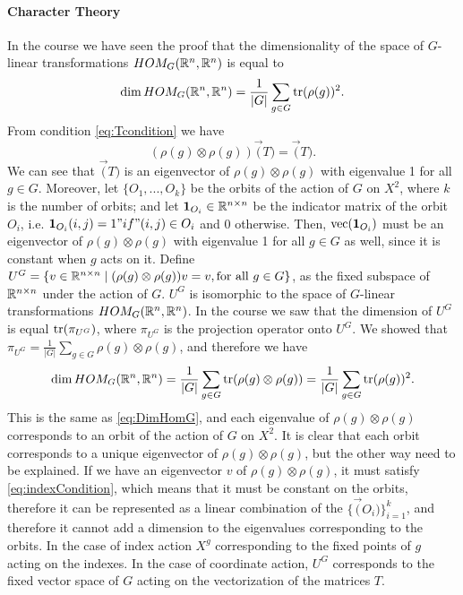 \documentclass[english]{article}
\begin{document}
\paragraph{Character Theory}
In the course we have seen the proof that the dimensionality of the space of $G$-linear transformations $HOM_G(\mathbb{R}^n,\mathbb{R}^n)$ is equal to 
\begin{equation}
    \dim HOM_G(\mathbb{R}^n,\mathbb{R}^n) = \frac{1}{|G|} \sum_{g \in G} \text{tr}(\rho(g))^2
    \label{eq:DimHomG}
    .
\end{equation}
From condition \eqref{eq:Tcondition} we have 
\begin{equation}
    (\rho(g) \otimes \rho(g)) \vec(T) = \vec(T) 
    .
    \label{eq:rhoT}
\end{equation}
We can see that $\vec(T)$ is an eigenvector of $\rho(g) \otimes \rho(g)$ with eigenvalue 1 for all $g \in G$. 
Moreover, let $\{O_1, ..., O_k\}$ be the orbits of the action of $G$ on $X^2$, where $k$ is the number of orbits; and let $\mathbf{1}_{O_i} \in \mathbb{R}^{n\times n}$ be the indicator matrix of the orbit $O_i$, i.e. $\mathbf{1}_{O_i}(i,j) = 1" if "(i,j) \in O_i$ and $0$ otherwise. 
Then, $\text{vec}(\mathbf{1}_{O_i})$ must be an eigenvector of $\rho(g) \otimes \rho(g)$ with eigenvalue 1 for all $g \in G$ as well, since it is constant when $g$ acts on it.
Define  $U^G = \{v \in \mathbb{R}^{n\times n} \mid (\rho(g) \otimes \rho(g)) v = v, \text{for all } g \in G\}$, as the fixed subspace of $\mathbb{R}^{n\times n}$ under the action of $G$. $U^G$ is isomorphic to the space of $G$-linear transformations $HOM_G(\mathbb{R}^n,\mathbb{R}^n)$. In the course we saw that the dimension of $U^G$ is equal $\text{tr}(\pi_{U^G})$, where $\pi_{U^G}$ is the projection operator onto $U^G$. We showed that $\pi_{U^G} = \frac{1}{|G|} \sum_{g \in G} \rho(g) \otimes \rho(g)$, and therefore we have
\begin{equation}
    \dim HOM_G(\mathbb{R}^n,\mathbb{R}^n) = \frac{1}{|G|} \sum_{g \in G} \text{tr}(\rho(g) \otimes \rho(g)) = \frac{1}{|G|} \sum_{g \in G} \text{tr}(\rho(g))^2
    .
    \label{eq:DimHomG2}
\end{equation}
This is the same as \eqref{eq:DimHomG}, and each eigenvalue of $\rho(g) \otimes \rho(g)$ corresponds to an orbit of the action of $G$ on $X^2$.
It is clear that each orbit corresponds to a unique eigenvector of $\rho(g) \otimes \rho(g)$, but the other way need to be explained. If we have an eigenvector $v$ of $\rho(g) \otimes \rho(g)$, it must satisfy \eqref{eq:indexCondition}, which means that it must be constant on the orbits, therefore it can be represented as a linear combination of the $\{\vec(O_i)\}_{i=1}^k$, and therefore it cannot add a dimension to the eigenvalues corresponding to the orbits.
In the case of index action $X^g$ corresponding to the fixed points of $g$ acting on the indexes. In the case of coordinate action, $U^G$ corresponds to the fixed vector space of $G$ acting on the vectorization of the matrices $T$.
\end{document}
